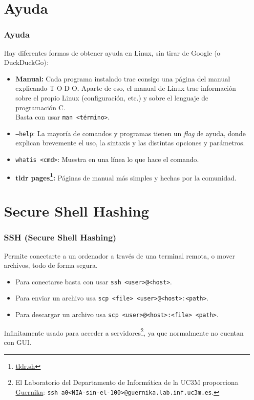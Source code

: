 \documentclass[aspectratio=43]{beamer}
\begin{document}
\section{Ayuda}

\begin{frame}
    \frametitle{Ayuda}
    Hay diferentes formas de obtener ayuda en Linux, sin tirar de Google (o DuckDuckGo):

    \begin{itemize}
        \item \textbf{Manual:} Cada programa instalado trae consigo una página del manual explicando T-O-D-O. Aparte de eso, el manual de Linux trae información sobre el propio Linux (configuración, etc.) y sobre el lenguaje de programación C.\\
        Basta con usar \texttt{man <término>}.
        \item \texttt{--help}: La mayoría de comandos y programas tienen un \textit{flag} de ayuda, donde explican brevemente el uso, la sintaxis y las distintas opciones y parámetros.
        \item \texttt{whatis <cmd>}: Muestra en una línea lo que hace el comando.
        \item \textbf{tldr pages\footnote{\href{https://tldr.sh/}{tldr.sh}}:} Páginas de manual más simples y hechas por la comunidad.
    \end{itemize}
\end{frame}


\section{Secure Shell Hashing}


\begin{frame}
    \frametitle{SSH (Secure Shell Hashing)}
    Permite conectarte a un ordenador a través de una terminal remota, o mover archivos, todo de forma segura.

    \begin{itemize}
        \item Para conectarse basta con usar \texttt{ssh <user>@<host>}.
        \item Para enviar un archivo usa \texttt{scp <file> <user>@<host>:<path>}.
        \item Para descargar un archivo usa \texttt{scp <user>@<host>:<file> <path>}.
    \end{itemize}

    Infinitamente usado para acceder a servidores\footnote{El Laboratorio del Departamento de Informática de la UC3M proporciona \href{https://www.lab.inf.uc3m.es/wp-content/docs/Manual_ConexionSSH.pdf}{Guernika}: \texttt{ssh a0<NIA-sin-el-100>@guernika.lab.inf.uc3m.es}.}, ya que normalmente no cuentan con GUI.

\end{frame}
\end{document}
